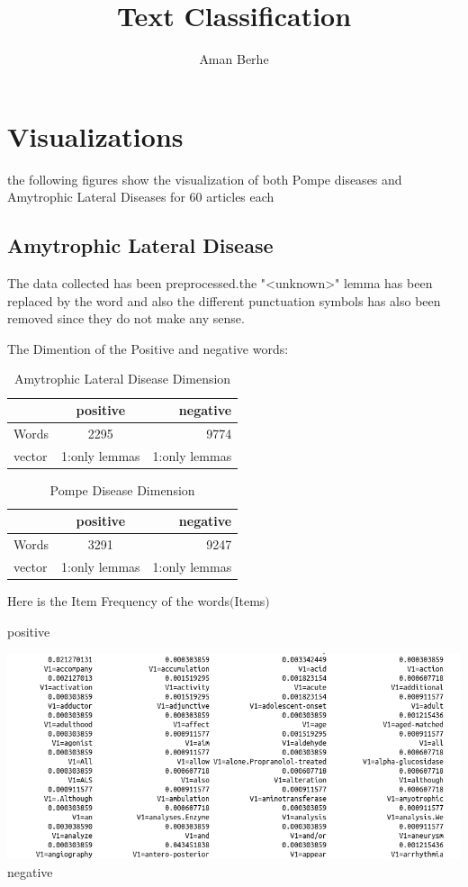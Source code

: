 \documentclass{article}
\title{Text Classification }
\author{Aman Berhe}
\begin{document}
\maketitle
\newpage
\section{Visualizations}
the following figures show the visualization of both Pompe diseases and Amytrophic Lateral 
Diseases for 60 articles each
\subsection{Amytrophic Lateral Disease}
The data collected has been preprocessed.the "<unknown>" lemma has been replaced by the word 
and also the different punctuation symbols has also been removed since they do not make any sense.

The Dimention of the Positive and negative words: 
\begin{table}[h!]
  \centering
  \caption{Amytrophic Lateral Disease Dimension}
  \label{tab:table1}
  \begin{tabular}{l|c|r}
      & positive & negative\\
    \hline
      Words &  2295  & 9774 \\
    \hline
      vector &  1:only lemmas  & 1:only lemmas \\
  \end{tabular}
\end{table}
\begin{table}[h!]
  \centering
  \caption{Pompe Disease Dimension}
  \label{tab:table1}
  \begin{tabular}{l|c|r}
      & positive & negative\\
    \hline
      Words &  3291  & 9247 \\
    \hline
      vector &  1:only lemmas  & 1:only lemmas \\
  \end{tabular}
\end{table}
\newpage
Here is the Item Frequency of the words$($Items$)$

positive 

\includegraphics[width=0.8\linewidth]{freqPosit.png}\\
negative
\end{document}
